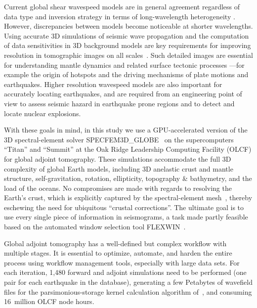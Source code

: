 \documentclass[extra,mreferee]{gji}
\begin{document}
Current global shear wavespeed models are in general agreement regardless of data type and inversion strategy in terms of long-wavelength heterogeneity \citep{ritzwollerlavely1995,TW01,beckerboschi2002}.
However, discrepancies between models become noticeable at shorter wavelengths.
Using accurate 3D simulations of seismic wave propagation and the computation of data sensitivities in 3D background models are key requirements for improving resolution in tomographic images on all scales~\citep{Tromp2020}.
Such detailed images are essential for understanding mantle dynamics and related surface tectonic processes
---for example the origin of hotspots and the driving mechanisms of plate motions and earthquakes.
Higher resolution wavespeed models are also important for accurately locating earthquakes, and are required from an engineering point of view to assess seismic hazard in earthquake prone regions and to detect and locate nuclear explosions. 

With these goals in mind,
in this study we use a GPU-accelerated version of the 3D spectral-element solver
SPECFEM3D\_GLOBE~\citep{KoTr02a,KoTr02b} on the supercomputers ``Titan'' and ``Summit'' at the Oak Ridge Leadership Computing Facility (OLCF) for global adjoint tomography.
These simulations accommodate the full 3D complexity of global Earth models,
including 3D anelastic crust and mantle structure, self-gravitation, rotation, ellipticity, topography \& bathymetry, and the load of the oceans.
No compromises are made with regards to resolving the Earth's crust,
which is explicitly captured by the spectral-element mesh~\citep{tromp2010a},
thereby eschewing the need for ubiquitous ``crustal corrections''.
The ultimate goal is to use every single piece of information in seismograms,
a task made partly feasible based on the automated window selection tool FLEXWIN~\citep{maggi2009automated}.

Global adjoint tomography has a well-defined but complex workflow with multiple stages.
It is essential to optimize, automate, and harden the entire process using workflow management tools, especially with large data sets.
For each iteration,
1,480 forward and adjoint simulations need to be performed (one pair for each earthquake in the database),
generating a few Petabytes of wavefield files for the parsimonious-storage kernel calculation algorithm of~\cite{KoXiBoPeSaLiTr16}, and consuming 16~million OLCF node hours.
\end{document}
